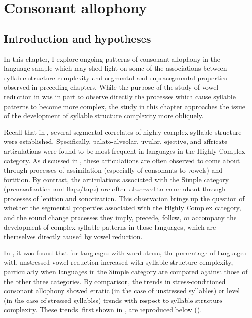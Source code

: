 \chapter{Consonant allophony}\label{sec:7}
\section{Introduction and hypotheses}\label{sec:7.1}

  In this chapter, I explore ongoing patterns of consonant allophony in the language sample which may shed light on some of the associations between syllable structure complexity and segmental and suprasegmental properties observed in preceding chapters. While the purpose of the study of vowel reduction in  was in part to observe directly the processes which cause syllable patterns to become more complex, the study in this chapter approaches the issue of the development of syllable structure complexity more obliquely. 

  Recall that in , several segmental correlates of highly complex syllable structure were established. Specifically, palato-alveolar, uvular, ejective, and affricate articulations were found to be most frequent in languages in the Highly Complex category. As discussed in , these articulations are often observed to come about through processes of assimilation (especially of consonants to vowels) and fortition. By contrast, the articulations associated with the Simple category (prenasalization and flaps/taps) are often observed to come about through processes of lenition and sonorization. This observation brings up the question of whether the segmental properties associated with the Highly Complex category, and the sound change processes they imply, precede, follow, or accompany the development of complex syllable patterns in those languages, which are themselves directly caused by vowel reduction.

  In , it was found that for languages with word stress, the percentage of languages with unstressed vowel reduction increased with syllable structure complexity, particularly when languages in the Simple category are compared against those of the other three categories. By comparison, the trends in stress-conditioned consonant allophony showed erratic (in the case of unstressed syllables) or level (in the case of stressed syllables) trends with respect to syllable structure complexity. These trends, first shown in , are reproduced below ().


